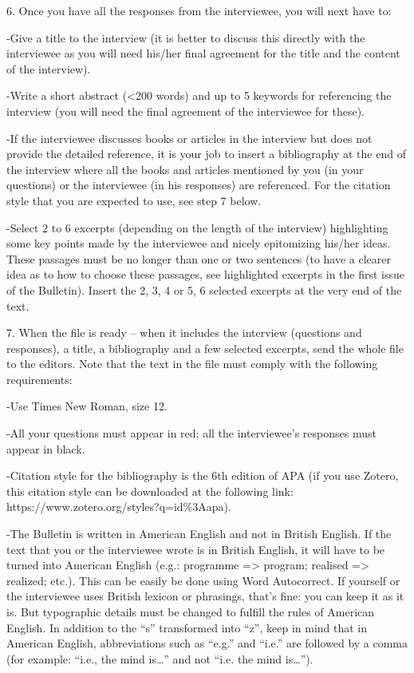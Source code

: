 \documentclass[11pt]{article}
\begin{document}
6. Once you have all the responses from the interviewee, you will next have to:\par

-Give a title to the interview (it is better to discuss this directly with the interviewee as you will need his/her final agreement for the title and the content of the interview).\par

-Write a short abstract (<200 words) and up to 5 keywords for referencing the interview (you will need the final agreement of the interviewee for these).\par

-If the interviewee discusses books or articles in the interview but does not provide the detailed reference, it is your job to insert a bibliography at the end of the interview where all the books and articles mentioned by you (in your questions) or the interviewee (in his responses) are referenced. For the citation style that you are expected to use, see step 7 below.\par

-Select 2 to 6 excerpts (depending on the length of the interview) highlighting some key points made by the interviewee and nicely epitomizing his/her ideas. These passages must be no longer than one or two sentences (to have a clearer idea as to how to choose these passages, see highlighted excerpts in the first issue of the Bulletin). Insert the 2, 3, 4 or 5, 6 selected excerpts at the very end of the text.\par

7. When the file is ready – when it includes the interview (questions and responses), a title, a bibliography and a few selected excerpts, send the whole file to the editors. Note that the text in the file must comply with the following requirements:\par

-Use Times New Roman, size 12.\par

-All your questions must appear in red; all the interviewee’s responses must appear in black.\par

-Citation style for the bibliography is the 6th edition of APA (if you use Zotero, this citation style can be downloaded at the following link: https://www.zotero.org/styles?q=id\%3Aapa).\par

-The Bulletin is written in American English and not in British English. If the text that you or the interviewee wrote is in British English, it will have to be turned into American English (e.g.: programme => program; realised => realized; etc.). This can be easily be done using Word Autocorrect. If yourself or the interviewee uses British lexicon or phrasings, that’s fine: you can keep it as it is. But typographic details must be changed to fulfill the rules of American English. In addition to the “s” transformed into “z”, keep in mind that in American English, abbreviations such as “e.g.” and “i.e.” are followed by a comma (for example: “i.e., the mind is…” and not “i.e. the mind is…”).\par
\end{document}
